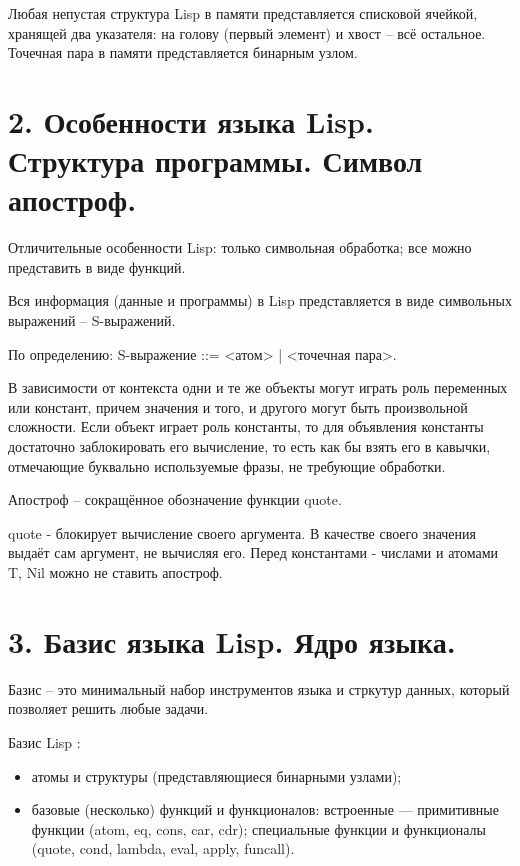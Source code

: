 \documentclass[12pt]{report}
\begin{document}
Любая непустая структура Lisp в памяти представляется списковой ячейкой, хранящей два указателя: на голову (первый элемент) и хвост – всё остальное. Точечная пара в памяти представляется бинарным узлом.

\section*{2.	Особенности языка Lisp. Структура программы. Символ апостроф.}

Отличительные особенности Lisp: только символьная обработка; все можно представить в виде функций.
	
Вся информация (данные и программы) в Lisp представляется в виде символьных выражений – S-выражений. 

По определению: S-выражение ::= <атом> | <точечная пара>.
	
В зависимости от контекста одни и те же объекты могут играть роль переменных или констант, причем значения и того, и другого могут быть произвольной сложности. Если объект играет роль константы, то для объявления константы достаточно заблокировать его вычисление, то есть как бы взять его в кавычки, отмечающие буквально используемые фразы, не требующие обработки. 

Апостроф – сокращённое обозначение функции quote.

quote - блокирует вычисление своего аргумента. В качестве своего значения выдаёт сам аргумент, не вычисляя его. Перед константами - числами и атомами T, Nil можно не ставить апостроф.




\section*{3.	Базис языка Lisp. Ядро языка.}
Базис -- это минимальный набор инструментов языка и стркутур данных, который позволяет решить любые задачи.




Базис Lisp :

\begin{itemize}
	\item атомы и структуры (представляющиеся бинарными узлами);
	\item базовые (несколько) функций и функционалов: встроенные — примитивные 
	функции (atom, eq, cons, car, cdr); специальные функции и функционалы (quote, 
	cond, lambda, eval, apply, funcall).

\end{itemize}
	
\end{document}
